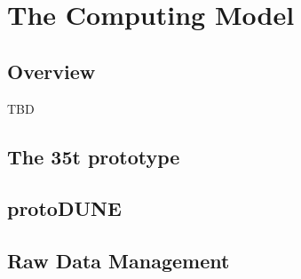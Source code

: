 \section{The Computing Model}
\subsection{Overview}
TBD
\subsection{The 35t prototype}

\newpage
\subsection{protoDUNE}




\subsection{Raw Data Management}
